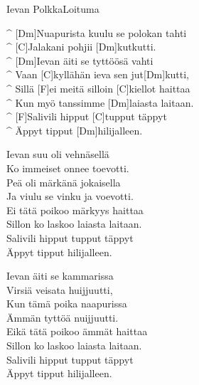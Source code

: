 \begin{song}{Ievan Polkka}{Loituma}

\begin{guitar}
^ [Dm]Nuapurista kuulu se polokan tahti\\
^ [C]Jalakani pohjii [Dm]kutkutti.\\
^ [Dm]Ievan äiti se tyttöösä vahti\\
^ Vaan [C]kyllähän ieva sen jut[Dm]kutti,\\
^ Sillä [F]ei meitä silloin [C]kiellot haittaa\\
^ Kun myö tanssimme [Dm]laiasta laitaan.\\
^ [F]Salivili hipput [C]tupput täppyt\\
^ Äppyt tipput [Dm]hilijalleen. \\
\end{guitar}

\begin{guitar}
Ievan suu oli vehnäsellä\\
Ko immeiset onnee toevotti.\\
Peä oli märkänä jokaisella\\
Ja viulu se vinku ja voevotti.\\
Ei tätä poikoo märkyys haittaa\\
Sillon ko laskoo laiasta laitaan.\\
Salivili hipput tupput täppyt\\
Äppyt tipput hilijalleen.\\
\end{guitar}

\begin{guitar}
Ievan äiti se kammarissa\\
Virsiä veisata huijjuutti,\\
Kun tämä poika naapurissa\\
Ämmän tyttöä nuijjuutti.\\
Eikä tätä poikoo ämmät haittaa\\
Sillon ko laskoo laiasta laitaan.\\
Salivili hipput tupput täppyt\\
Äppyt tipput hilijalleen.\\
\end{guitar}


\end{song}
